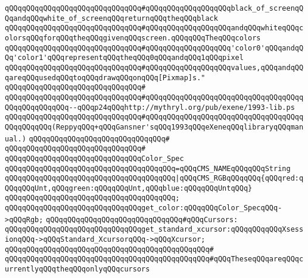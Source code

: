 \verb|qQQqqQQqqQQqqQQqqQQqqQQqqQQqqQQq#qQQqqQQqqQQqqQQqqQQqblack_of_screenqQQqandqQQqwhite_of_screenqQQqreturnqQQqtheqQQqblack|\newline
\verb|qQQqqQQqqQQqqQQqqQQqqQQqqQQqqQQq#qQQqqQQqqQQqqQQqqQQqandqQQqwhiteqQQqcolorsqQQqforqQQqtheqQQqgivenqQQqscreen.qQQqqQQqTheqQQqcolors|\newline
\verb|qQQqqQQqqQQqqQQqqQQqqQQqqQQqqQQq#qQQqqQQqqQQqqQQqqQQq'color0'qQQqandqQQq'color1'qQQqrepresentqQQqtheqQQq0qQQqandqQQq1qQQqpixel|\newline
\verb|qQQqqQQqqQQqqQQqqQQqqQQqqQQqqQQq#qQQqqQQqqQQqqQQqqQQqvalues,qQQqandqQQqareqQQqusedqQQqtoqQQqdrawqQQqonqQQq[Pixmap]s."|\newline
\verb|qQQqqQQqqQQqqQQqqQQqqQQqqQQqqQQq#|\newline
\verb|qQQqqQQqqQQqqQQqqQQqqQQqqQQqqQQq#qQQqqQQqqQQqqQQqqQQqqQQqqQQqqQQqqQQqqQQqqQQqqQQqqQQq--qQQqp24qQQqhttp://mythryl.org/pub/exene/1993-lib.ps|\newline
\verb|qQQqqQQqqQQqqQQqqQQqqQQqqQQqqQQq#qQQqqQQqqQQqqQQqqQQqqQQqqQQqqQQqqQQqqQQqqQQqqQQq(ReppyqQQq+qQQqGansner'sqQQq1993qQQqeXeneqQQqlibraryqQQqmanual.)|\newline
\verb|qQQqqQQqqQQqqQQqqQQqqQQqqQQqqQQq#|\newline
\verb|qQQqqQQqqQQqqQQqqQQqqQQqqQQqqQQq#|\newline
\verb|qQQqqQQqqQQqqQQqqQQqqQQqqQQqqQQqColor_Spec|\newline
\verb|qQQqqQQqqQQqqQQqqQQqqQQqqQQqqQQqqQQqqQQq=qQQqCMS_NAMEqQQqqQQqString|\newline
\verb|qQQqqQQqqQQqqQQqqQQqqQQqqQQqqQQqqQQqqQQq|\verb#|qQQqCMS_RGBqQQqqQQq{qQQqred:qQQqqQQqUnt,qQQqgreen:qQQqqQQqUnt,qQQqblue:qQQqqQQqUntqQQq}#\newline
\verb|qQQqqQQqqQQqqQQqqQQqqQQqqQQqqQQqqQQqqQQq;|\newline
\newline
\verb|qQQqqQQqqQQqqQQqqQQqqQQqqQQqqQQqget_color:qQQqqQQqColor_SpecqQQq->qQQqRgb;|\newline
\newline
\newline
\verb|qQQqqQQqqQQqqQQqqQQqqQQqqQQqqQQq#qQQqCursors:|\newline
\newline
\verb|qQQqqQQqqQQqqQQqqQQqqQQqqQQqqQQqget_standard_xcursor:qQQqqQQqqQQqXsessionqQQq->qQQqStandard_XcursorqQQq->qQQqXcursor;|\newline
\verb|qQQqqQQqqQQqqQQqqQQqqQQqqQQqqQQqqQQqqQQqqQQqqQQq#|\newline
\verb|qQQqqQQqqQQqqQQqqQQqqQQqqQQqqQQqqQQqqQQqqQQqqQQq#qQQqTheseqQQqareqQQqcurrentlyqQQqtheqQQqonlyqQQqcursors|\newline
